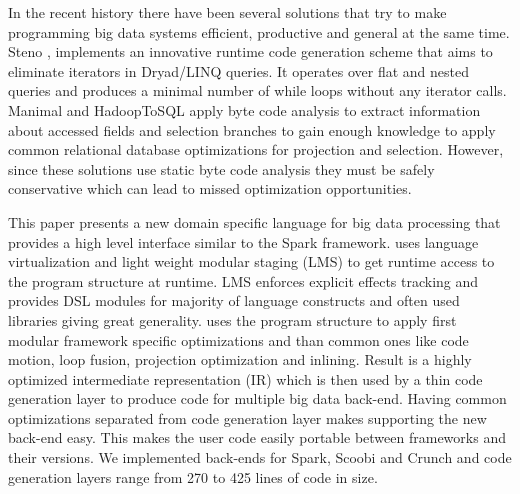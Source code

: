 In the recent history there have been several solutions that try to make programming big data systems efficient, productive and general at the same time. Steno \cite{murray_steno:_2011}, implements an innovative runtime code generation scheme that aims to eliminate iterators in Dryad/LINQ queries. It operates over flat and nested queries and produces a minimal number of while loops without any iterator calls. Manimal \cite{jahani_automatic_2011} and HadoopToSQL \cite{iu_hadooptosql:_2010} apply byte code analysis to extract information about accessed fields and selection branches to gain enough knowledge to apply common relational database optimizations for projection and selection. However, since these solutions use static byte code analysis they must be safely conservative which can lead to missed optimization opportunities.         

This paper presents a new domain specific language \tool for big data processing that provides a high level interface similar to the Spark framework. \tool uses language virtualization \cite{moors_scala-virtualized_2012} and light weight modular staging (LMS)\cite{rompf_lightweight_2010} to get runtime access to the program structure at runtime. LMS enforces explicit effects tracking and provides DSL modules for majority of language constructs and often used libraries giving \tool great generality. \tool uses the program structure to apply first modular framework specific optimizations and than common ones like code motion, loop fusion, projection optimization and inlining. Result is a highly optimized intermediate representation (IR) which is then used by a thin code generation layer to produce code for multiple big data back-end. Having common optimizations separated from code generation layer makes supporting the new back-end  easy. This makes the user code easily portable between frameworks and their versions. We implemented back-ends for Spark, Scoobi \cite{nicta_scoobi_2012} and Crunch \cite{_crunch_2012} and code generation layers range from 270 to 425 lines of code in size. 


